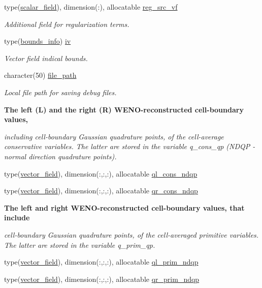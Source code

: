 \begin{DoxyCompactItemize}
type(\hyperlink{structm__derived__types_1_1scalar__field}{scalar\+\_\+field}), dimension(\+:), allocatable \hyperlink{namespacem__rhs_ae60a6ab812c015411331658e16e5ab77}{reg\+\_\+src\+\_\+vf}
\begin{DoxyCompactList}\small\item\em Additional field for regularization terms. \end{DoxyCompactList}\item 
type(\hyperlink{structm__derived__types_1_1bounds__info}{bounds\+\_\+info}) \hyperlink{namespacem__rhs_a4ab97e22609b5ebbb97524ca7bae05ef}{iv}
\begin{DoxyCompactList}\small\item\em Vector field indical bounds. \end{DoxyCompactList}\item 
character(50) \hyperlink{namespacem__rhs_a31f27cef4252ee5a36802fd02b3f8ac9}{file\+\_\+path}
\begin{DoxyCompactList}\small\item\em Local file path for saving debug files. \end{DoxyCompactList}\end{DoxyCompactItemize}
\begin{Indent}\textbf{ The left (L) and the right (R) W\+E\+N\+O-\/reconstructed cell-\/boundary values,}\par
{\em including cell-\/boundary Gaussian quadrature points, of the cell-\/average conservative variables. The latter are stored in the variable q\+\_\+cons\+\_\+qp (N\+D\+QP -\/ normal direction quadrature points). }\begin{DoxyCompactItemize}
\item 
type(\hyperlink{structm__derived__types_1_1vector__field}{vector\+\_\+field}), dimension(\+:,\+:,\+:), allocatable \hyperlink{namespacem__rhs_abe42bc1610e9369b701122a870fed48d}{ql\+\_\+cons\+\_\+ndqp}
\item 
type(\hyperlink{structm__derived__types_1_1vector__field}{vector\+\_\+field}), dimension(\+:,\+:,\+:), allocatable \hyperlink{namespacem__rhs_a1b6a05895f56a60c075e4eee3f1b4d51}{qr\+\_\+cons\+\_\+ndqp}
\end{DoxyCompactItemize}
\end{Indent}
\begin{Indent}\textbf{ The left and right W\+E\+N\+O-\/reconstructed cell-\/boundary values, that include}\par
{\em cell-\/boundary Gaussian quadrature points, of the cell-\/averaged primitive variables. The latter are stored in the variable q\+\_\+prim\+\_\+qp. }\begin{DoxyCompactItemize}
\item 
type(\hyperlink{structm__derived__types_1_1vector__field}{vector\+\_\+field}), dimension(\+:,\+:,\+:), allocatable \hyperlink{namespacem__rhs_aeb611ac510e15d25ae5313627f9a55af}{ql\+\_\+prim\+\_\+ndqp}
\item 
type(\hyperlink{structm__derived__types_1_1vector__field}{vector\+\_\+field}), dimension(\+:,\+:,\+:), allocatable \hyperlink{namespacem__rhs_addb553c30e5a799670b33c66a27995d6}{qr\+\_\+prim\+\_\+ndqp}
\end{DoxyCompactItemize}
\end{Indent}

